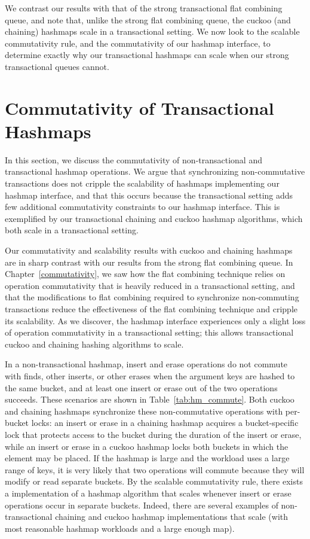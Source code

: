 We contrast our results with that of the strong transactional flat combining queue, and note that, unlike the strong flat combining queue, the cuckoo (and chaining) hashmaps scale in a transactional setting. We now look to the scalable commutativity rule, and the commutativity of our hashmap interface, to determine exactly why our transactional hashmaps can scale when our strong transactional queues cannot. 

\section{Commutativity of Transactional Hashmaps}
\label{hm_deps}

In this section, we discuss the commutativity of non-transactional and transactional hashmap operations. We argue that synchronizing non-commutative transactions does not cripple the scalability of hashmaps implementing our hashmap interface, and that this occurs because the transactional setting adds few additional commutativity constraints to our hashmap interface. This is exemplified by our transactional chaining and cuckoo hashmap algorithms, which both scale in a transactional setting. 

Our commutativity and scalability results with cuckoo and chaining hashmaps are in sharp contrast with our results from the strong flat combining queue. In Chapter~\ref{commutativity}, we saw how the flat combining technique relies on operation commutativity that is heavily reduced in a transactional setting, and that the modifications to flat combining required to synchronize non-commuting transactions reduce the effectiveness of the flat combining technique and cripple its scalability. 
As we discover, the hashmap interface experiences only a slight loss of operation commutativity in a transactional setting; this allows transactional cuckoo and chaining hashing algorithms to scale.

In a non-transactional hashmap, insert and erase operations do not commute with finds, other inserts, or other erases when the argument keys are hashed to the same bucket, and at least one insert or erase out of the two operations succeeds.
    These scenarios are shown in Table~\ref{tab:hm_commute}. Both cuckoo and chaining hashmaps synchronize these non-commutative operations with per-bucket locks: an insert or erase in a chaining hashmap acquires a bucket-specific lock that protects access to the bucket during the duration of the insert or erase, while an insert or erase in a cuckoo hashmap locks both buckets in which the element may be placed. If the hashmap is large and the workload uses a large range of keys, it is very likely that two operations will commute because they will modify or read separate buckets.
By the scalable commutativity rule, there exists a implementation of a hashmap algorithm that scales whenever insert or erase operations occur in separate buckets. Indeed, there are several examples of non-transactional chaining and cuckoo hashmap implementations that scale (with most reasonable hashmap workloads and a large enough map).


